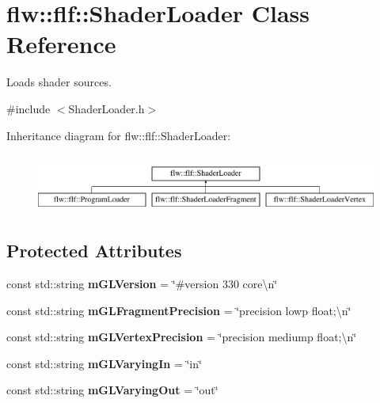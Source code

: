 \hypertarget{classflw_1_1flf_1_1ShaderLoader}{}\section{flw\+:\+:flf\+:\+:Shader\+Loader Class Reference}
\label{classflw_1_1flf_1_1ShaderLoader}


Loads shader sources.  




{\ttfamily \#include $<$Shader\+Loader.\+h$>$}

Inheritance diagram for flw\+:\+:flf\+:\+:Shader\+Loader\+:\begin{figure}[H]
\begin{center}
\leavevmode
\includegraphics[height=1.934370cm]{classflw_1_1flf_1_1ShaderLoader}
\end{center}
\end{figure}
\subsection*{Protected Attributes}
\begin{DoxyCompactItemize}
\item 
\mbox{\label{classflw_1_1flf_1_1ShaderLoader_a5514301f2a3313c6de047b19844a53fa}} 
const std\+::string {\bfseries m\+G\+L\+Version} = \char`\"{}\#version 330 core\textbackslash{}n\char`\"{}
\item 
\mbox{\label{classflw_1_1flf_1_1ShaderLoader_a90cf28089ee92b3a0ff340dee12eabf3}} 
const std\+::string {\bfseries m\+G\+L\+Fragment\+Precision} = \char`\"{}precision lowp float;\textbackslash{}n\char`\"{}
\item 
\mbox{\label{classflw_1_1flf_1_1ShaderLoader_a336c83eadf34b7c68b87dca554344311}} 
const std\+::string {\bfseries m\+G\+L\+Vertex\+Precision} = \char`\"{}precision mediump float;\textbackslash{}n\char`\"{}
\item 
\mbox{\label{classflw_1_1flf_1_1ShaderLoader_a5a4ad04f734342aa08f7ed634b4752f8}} 
const std\+::string {\bfseries m\+G\+L\+Varying\+In} = \char`\"{}in\char`\"{}
\item 
\mbox{\label{classflw_1_1flf_1_1ShaderLoader_a740f5f37efb809c9079e530502d37640}} 
const std\+::string {\bfseries m\+G\+L\+Varying\+Out} = \char`\"{}out\char`\"{}
\end{DoxyCompactItemize}


